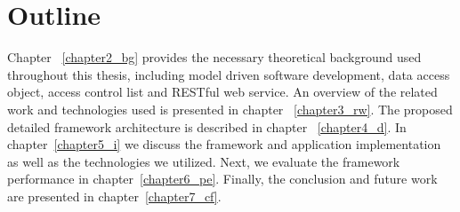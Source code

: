 \section{Outline}
Chapter ~\ref{chapter2_bg} provides the necessary theoretical background used throughout this thesis, including model driven software development, data access object, access control list and RESTful web service. An overview of the related work and technologies used is presented in chapter ~\ref{chapter3_rw}. The proposed detailed framework architecture is described in chapter ~\ref{chapter4_d}. In chapter~\ref{chapter5_i} we discuss the framework and application implementation as well as the technologies we utilized. Next, we evaluate the framework performance in chapter~\ref{chapter6_pe}. Finally, the conclusion and future work are presented in chapter~\ref{chapter7_cf}.